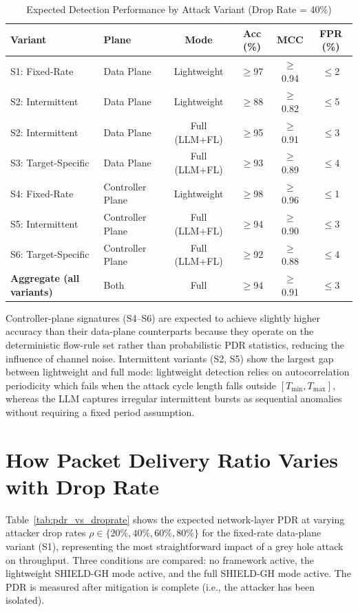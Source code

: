 \documentclass[12pt, a4paper]{report}
\begin{document}
\begin{table}[htbp]
\renewcommand{\arraystretch}{1.3}
\caption{Expected Detection Performance by Attack Variant (Drop Rate = 40\%)}
\label{tab:detection_by_variant}
\centering
\scriptsize
\begin{tabular}{|l|l|c|c|c|c|}
\hline
\textbf{Variant} & \textbf{Plane} & \textbf{Mode} &
\textbf{Acc (\%)} & \textbf{MCC} & \textbf{FPR (\%)} \\
\hline
S1: Fixed-Rate         & Data Plane       & Lightweight & $\geq$97 & $\geq$0.94 & $\leq$2 \\
S2: Intermittent       & Data Plane       & Lightweight & $\geq$88 & $\geq$0.82 & $\leq$5 \\
S2: Intermittent       & Data Plane       & Full (LLM+FL) & $\geq$95 & $\geq$0.91 & $\leq$3 \\
S3: Target-Specific    & Data Plane       & Full (LLM+FL) & $\geq$93 & $\geq$0.89 & $\leq$4 \\
S4: Fixed-Rate         & Controller Plane & Lightweight & $\geq$98 & $\geq$0.96 & $\leq$1 \\
S5: Intermittent       & Controller Plane & Full (LLM+FL) & $\geq$94 & $\geq$0.90 & $\leq$3 \\
S6: Target-Specific    & Controller Plane & Full (LLM+FL) & $\geq$92 & $\geq$0.88 & $\leq$4 \\
\hline
\textbf{Aggregate (all variants)} & Both & Full & $\geq$94 & $\geq$0.91 & $\leq$3 \\
\hline
\end{tabular}
\end{table}

Controller-plane signatures (S4--S6) are expected to achieve slightly higher
accuracy than their data-plane counterparts because they operate on the
deterministic flow-rule set rather than probabilistic PDR statistics, reducing
the influence of channel noise. Intermittent variants (S2, S5) show the largest
gap between lightweight and full mode: lightweight detection relies on
autocorrelation periodicity which fails when the attack cycle length falls
outside $[T_{\min}, T_{\max}]$, whereas the LLM captures irregular intermittent
bursts as sequential anomalies without requiring a fixed period assumption.

\section{How Packet Delivery Ratio Varies with Drop Rate}

Table~\ref{tab:pdr_vs_droprate} shows the expected network-layer PDR at
varying attacker drop rates $\rho \in \{20\%, 40\%, 60\%, 80\%\}$ for the
fixed-rate data-plane variant (S1), representing the most straightforward
impact of a grey hole attack on throughput. Three conditions are compared:
no framework active, the lightweight SHIELD-GH mode active, and the full
SHIELD-GH mode active. The PDR is measured after mitigation is complete
(i.e., the attacker has been isolated).
\end{document}
